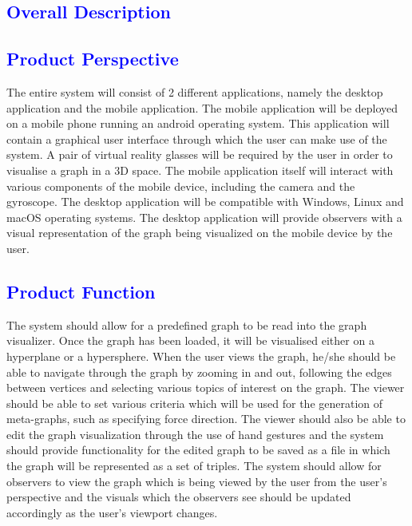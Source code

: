 \documentclass[12pt]{article}
\begin{document}
\textcolor{blue}{\section{Overall Description}}
\textcolor{blue}{\subsection{Product Perspective}}
\begin{flushleft}
The entire system will consist of 2 different applications, namely the desktop application and the mobile application. The mobile application will be deployed on a mobile phone running an android operating system. This application will contain a graphical user interface through which the user can make use of the system. A pair of virtual reality glasses will be required by the user in order to visualise a graph in a 3D space. The mobile application itself will interact with various components of the mobile device, including the camera and the gyroscope. The desktop application will be compatible with Windows, Linux and macOS operating systems. The desktop application will provide observers with a visual representation of the graph being visualized on the mobile device by the user.
\end{flushleft}

\textcolor{blue}{\subsection{Product Function}}
\begin{flushleft}
The system should allow for a predefined graph to be read into the graph visualizer. Once the graph has been loaded, it will be visualised either on a hyperplane or a hypersphere. When the user views the graph, he/she should be able to navigate through the graph by zooming in and out, following the edges between vertices and selecting various topics of interest on the graph. The viewer should be able to set various criteria which will be used for the generation of meta-graphs, such as specifying force direction. The viewer should also be able to edit the graph visualization through the use of hand gestures and the system should provide functionality for the edited graph to be saved as a file in which the graph will be represented as a set of triples. The system should allow for observers to view the graph which is being viewed by the user from the user’s perspective and the visuals which the observers see should be updated accordingly as the user’s viewport changes.
\end{flushleft}
\end{document}
